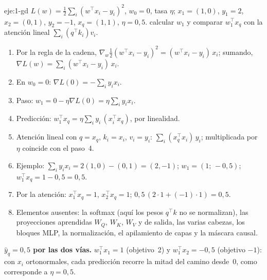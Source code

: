 \begin{solucion}{eje:1-gd}
\datos $L(w)=\frac12\sum_i(w^{\top}x_i-y_i)^{2}$, $w_0=0$, tasa $\eta$; $x_1=(1,0)$, $y_1=2$, $x_2=(0,1)$, $y_2=-1$, $x_q=(1,1)$, $\eta=0{,}5$.
\planteamiento calcular $w_1$ y comparar $w_1^{\top}x_q$ con la atención lineal $\sum_i(q^{\top}k_i)v_i$.
\pasos
\begin{enumerate}[label=\arabic*.]
  \item Por la regla de la cadena, $\nabla_w\frac12(w^{\top}x_i-y_i)^{2}=(w^{\top}x_i-y_i)\,x_i$; sumando, $\nabla L(w)=\sum_i(w^{\top}x_i-y_i)\,x_i$.
  \item En $w_0=0$: $\nabla L(0)=-\sum_i y_ix_i$.
  \item Paso: $w_1=0-\eta\nabla L(0)=\eta\sum_i y_ix_i$.
  \item Predicción: $w_1^{\top}x_q=\eta\sum_i y_i\,(x_i^{\top}x_q)$, por linealidad.
  \item Atención lineal con $q=x_q$, $k_i=x_i$, $v_i=y_i$: $\sum_i(x_q^{\top}x_i)\,y_i$; multiplicada por $\eta$ coincide con el paso~4.
  \item Ejemplo: $\sum_i y_ix_i=2(1,0)-(0,1)=(2,-1)$; $w_1=(1;\,-0{,}5)$; $w_1^{\top}x_q=1-0{,}5=0{,}5$.
  \item Por la atención: $x_1^{\top}x_q=1$, $x_2^{\top}x_q=1$; $0{,}5\,(2\cdot 1+(-1)\cdot 1)=0{,}5$.
  \item Elementos ausentes: la softmax (aquí los pesos $q^{\top}k$ no se normalizan), las proyecciones aprendidas $W_Q$, $W_K$, $W_V$ y de salida, las varias cabezas, los bloques MLP, la normalización, el apilamiento de capas y la máscara causal.
\end{enumerate}
\resultado \textbf{$\hat y_q=0{,}5$ por las dos vías.}
\comprobacion $w_1^{\top}x_1=1$ (objetivo~2) y $w_1^{\top}x_2=-0{,}5$ (objetivo $-1$): con $x_i$ ortonormales, cada predicción recorre la mitad del camino desde~0, como corresponde a $\eta=0{,}5$.
\end{solucion}

